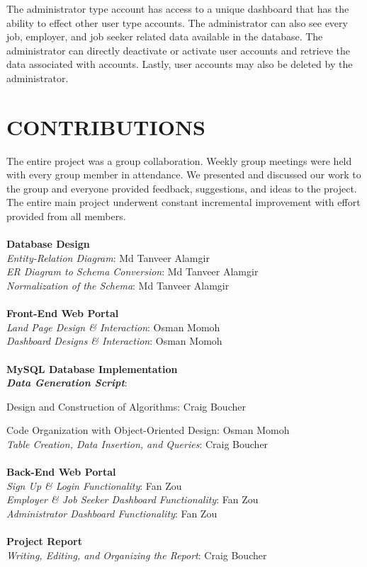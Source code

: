 \documentclass[11pt]{article}
\begin{document}
The administrator type account has access to a unique dashboard that has the ability to effect other user type accounts. The administrator can also see every job, employer, and job seeker related data available in the database. The administrator can directly deactivate or activate user accounts and retrieve the data associated with accounts. Lastly, user accounts may also be deleted by the administrator.

\newpage 

\section{CONTRIBUTIONS}

The entire project was a group collaboration. Weekly group meetings were held with every group member in attendance. We presented and discussed our work to the group and everyone provided feedback, suggestions, and ideas to the project. The entire main project underwent constant incremental improvement with effort provided from all members. \\
\\
\textbf{Database Design} \\
\textit{Entity-Relation Diagram}: Md Tanveer Alamgir \\
\textit{ER Diagram to Schema Conversion}: Md Tanveer Alamgir \\
\textit{Normalization of the Schema}: Md Tanveer Alamgir \\
\\
\textbf{Front-End Web Portal} \\
\textit{Land Page Design \& Interaction}: Osman Momoh \\
\textit{Dashboard Designs \& Interaction}: Osman Momoh \\
\\
\textbf{MySQL Database Implementation}\\
\textbf{\textit{Data Generation Script}}: \par
Design and Construction of Algorithms: Craig Boucher \par
Code Organization with Object-Oriented Design: Osman Momoh \\
\textit{Table Creation, Data Insertion, and Queries}: Craig Boucher \\
\\
\textbf{Back-End Web Portal} \\
\textit{Sign Up \& Login Functionality}: Fan Zou \\
\textit{Employer \& Job Seeker Dashboard Functionality}: Fan Zou \\
\textit{Administrator Dashboard Functionality}: Fan Zou \\
\\
\textbf{Project Report} \\
\textit{Writing, Editing, and Organizing the Report}: Craig Boucher


\end{document}
